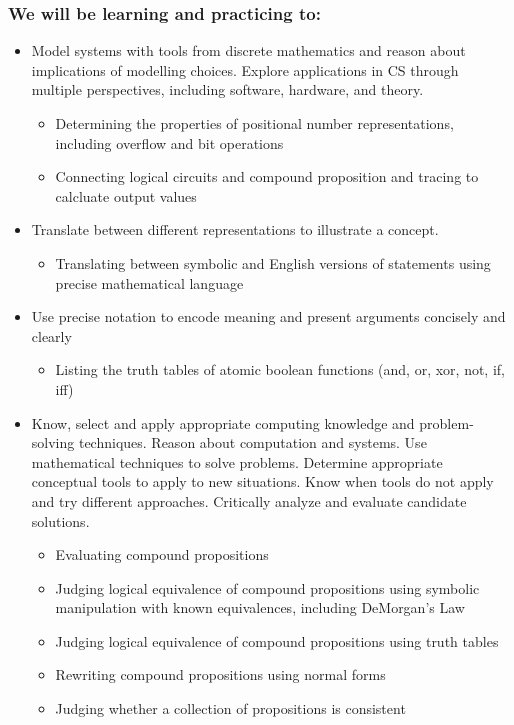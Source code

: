 \subsubsection*{We will be learning and practicing to:}
\begin{itemize}
\item Model systems with tools from discrete mathematics and reason about implications of modelling choices. Explore applications in CS through multiple perspectives, including software, hardware, and theory.
\begin{itemize}
    \item Determining the properties of positional number representations, including overflow and bit operations
   \item Connecting logical circuits and compound proposition and tracing to calcluate output values
\end{itemize}

\item Translate between different representations to illustrate a concept.
\begin{itemize}
   \item Translating between symbolic and English versions of statements using precise mathematical language
\end{itemize}

\item Use precise notation to encode meaning and present arguments concisely and clearly
\begin{itemize}
    \item Listing the truth tables of atomic boolean functions (and, or, xor, not, if, iff)
\end{itemize}

\item Know, select and apply appropriate computing knowledge and problem-solving techniques. Reason about computation and systems. Use mathematical techniques to solve problems. Determine appropriate conceptual tools to apply to new situations. Know when tools do not apply and try different approaches. Critically analyze and evaluate candidate solutions.
\begin{itemize}
    \item Evaluating compound propositions
    \item Judging logical equivalence of compound propositions using symbolic manipulation with known equivalences, including DeMorgan's Law
    \item Judging logical equivalence of compound propositions using truth tables
    \item Rewriting compound propositions using normal forms
    \item Judging whether a collection of propositions is consistent
\end{itemize}

\end{itemize}

